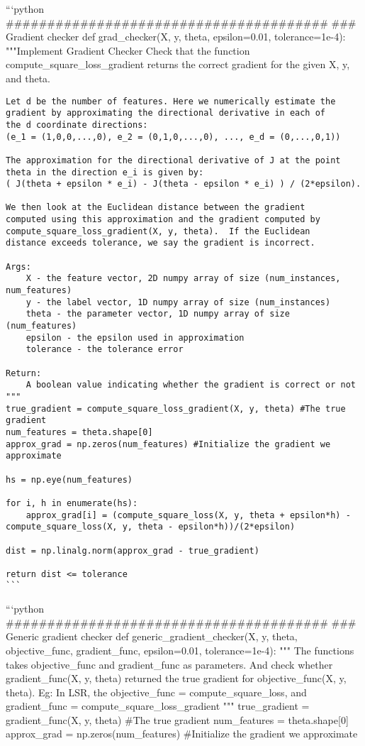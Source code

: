 \documentclass[11pt]{article}
\begin{document}
    ```python
\#\#\#\#\#\#\#\#\#\#\#\#\#\#\#\#\#\#\#\#\#\#\#\#\#\#\#\#\#\#\#\#\#\#\#\#\#\#\#
\#\#\# Gradient checker def grad\_checker(X, y, theta, epsilon=0.01,
tolerance=1e-4): """Implement Gradient Checker Check that the function
compute\_square\_loss\_gradient returns the correct gradient for the
given X, y, and theta.

\begin{verbatim}
Let d be the number of features. Here we numerically estimate the
gradient by approximating the directional derivative in each of
the d coordinate directions:
(e_1 = (1,0,0,...,0), e_2 = (0,1,0,...,0), ..., e_d = (0,...,0,1))

The approximation for the directional derivative of J at the point
theta in the direction e_i is given by:
( J(theta + epsilon * e_i) - J(theta - epsilon * e_i) ) / (2*epsilon).

We then look at the Euclidean distance between the gradient
computed using this approximation and the gradient computed by
compute_square_loss_gradient(X, y, theta).  If the Euclidean
distance exceeds tolerance, we say the gradient is incorrect.

Args:
    X - the feature vector, 2D numpy array of size (num_instances, num_features)
    y - the label vector, 1D numpy array of size (num_instances)
    theta - the parameter vector, 1D numpy array of size (num_features)
    epsilon - the epsilon used in approximation
    tolerance - the tolerance error

Return:
    A boolean value indicating whether the gradient is correct or not
"""
true_gradient = compute_square_loss_gradient(X, y, theta) #The true gradient
num_features = theta.shape[0]
approx_grad = np.zeros(num_features) #Initialize the gradient we approximate

hs = np.eye(num_features)

for i, h in enumerate(hs):
    approx_grad[i] = (compute_square_loss(X, y, theta + epsilon*h) - compute_square_loss(X, y, theta - epsilon*h))/(2*epsilon)
    
dist = np.linalg.norm(approx_grad - true_gradient)

return dist <= tolerance
```
\end{verbatim}

    ```python
\#\#\#\#\#\#\#\#\#\#\#\#\#\#\#\#\#\#\#\#\#\#\#\#\#\#\#\#\#\#\#\#\#\#\#\#\#\#\#
\#\#\# Generic gradient checker def generic\_gradient\_checker(X, y,
theta, objective\_func, gradient\_func, epsilon=0.01, tolerance=1e-4):
""" The functions takes objective\_func and gradient\_func as
parameters. And check whether gradient\_func(X, y, theta) returned the
true gradient for objective\_func(X, y, theta). Eg: In LSR, the
objective\_func = compute\_square\_loss, and gradient\_func =
compute\_square\_loss\_gradient """ true\_gradient = gradient\_func(X,
y, theta) \#The true gradient num\_features = theta.shape{[}0{]}
approx\_grad = np.zeros(num\_features) \#Initialize the gradient we
approximate
\end{document}
